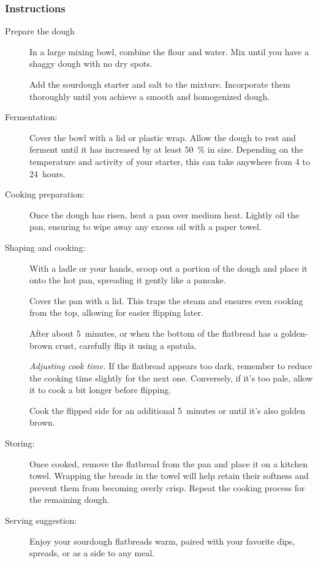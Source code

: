 \subsubsection*{Instructions}
\begin{description}
\item[Prepare the dough] In a large mixing bowl, combine the flour and water.
    Mix until you have a shaggy dough with no dry spots.

    Add the sourdough starter and salt to the mixture. Incorporate them
    thoroughly until you achieve a smooth and homogenized dough.

\item[Fermentation:] Cover the bowl with a lid or plastic wrap. Allow the dough
    to rest and ferment until it has increased by at least \qty{50}{\percent}
    in size.  Depending on the temperature and activity of your starter, this
    can take anywhere from 4 to 24~hours.

\item[Cooking preparation:] Once the dough has risen, heat a pan over medium
    heat.  Lightly oil the pan, ensuring to wipe away any excess oil with a
    paper towel.

\item[Shaping and cooking:] With a ladle or your hands, scoop out a portion of
    the dough and place it onto the hot pan, spreading it gently like a
    pancake.

    Cover the pan with a lid. This traps the steam and ensures even cooking
    from the top, allowing for easier flipping later.

    After about 5~minutes, or when the bottom of the flatbread has a
    golden-brown crust, carefully flip it using a spatula.

    \emph{Adjusting cook time.} If the flatbread appears too dark, remember to
    reduce the cooking time slightly for the next one.  Conversely, if it's
    too pale, allow it to cook a bit longer before flipping.

    Cook the flipped side for an additional 5~minutes or until it's also
    golden brown.

\item[Storing:] Once cooked, remove the flatbread from the pan and place it on
    a kitchen towel. Wrapping the breads in the towel will help retain their
    softness and prevent them from becoming overly crisp.  Repeat the cooking
    process for the remaining dough.

\item[Serving suggestion:] Enjoy your sourdough flatbreads warm, paired with
    your favorite dips, spreads, or as a side to any meal.

\end{description}
